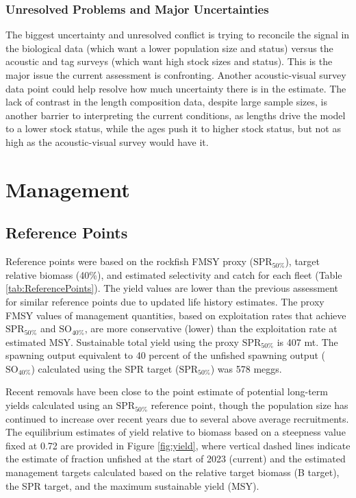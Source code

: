 \documentclass[11pt,
  english,
  letterpaper,
]{article}
\begin{document}
\hypertarget{unresolved-problems-and-major-uncertainties-1}{%
\subsubsection{Unresolved Problems and Major Uncertainties}\label{unresolved-problems-and-major-uncertainties-1}}

The biggest uncertainty and unresolved conflict is trying to reconcile the signal in the biological data (which want a lower population size and status) versus the acoustic and tag surveys (which want high stock sizes and status). This is the major issue the current assessment is confronting. Another acoustic-visual survey data point could help resolve how much uncertainty there is in the estimate. The lack of contrast in the length composition data, despite large sample sizes, is another barrier to interpreting the current conditions, as lengths drive the model to a lower stock status, while the ages push it to higher stock status, but not as high as the acoustic-visual survey would have it.

\hypertarget{management}{%
\section{Management}\label{management}}

\hypertarget{reference-points-1}{%
\subsection{Reference Points}\label{reference-points-1}}

Reference points were based on the rockfish FMSY proxy (\(\text{SPR}_{50\%}\)), target relative biomass (40\%), and estimated selectivity and catch for each fleet (Table \ref{tab:ReferencePoints}). The yield values are lower than the previous assessment for similar reference points due to updated life history estimates. The proxy FMSY values of management quantities, based on exploitation rates that achieve \(\text{SPR}_{50\%}\) and \(\text{SO}_{40\%}\), are more conservative (lower) than the exploitation rate at estimated MSY. Sustainable total yield using the proxy \(\text{SPR}_{50\%}\) is 407 mt. The spawning output equivalent to 40 percent of the unfished spawning output (\(\text{SO}_{40\%}\)) calculated using the SPR target (\(\text{SPR}_{50\%}\)) was 578 meggs.

Recent removals have been close to the point estimate of potential long-term yields calculated using an \(\text{SPR}_{50\%}\) reference point, though the population size has continued to increase over recent years due to several above average recruitments. The equilibrium estimates of yield relative to biomass based on a steepness value fixed at 0.72 are provided in Figure \ref{fig:yield}, where vertical dashed lines indicate the estimate of fraction unfished at the start of 2023 (current) and the estimated management targets calculated based on the relative target biomass (B target), the SPR target, and the maximum sustainable yield (MSY).
\end{document}
